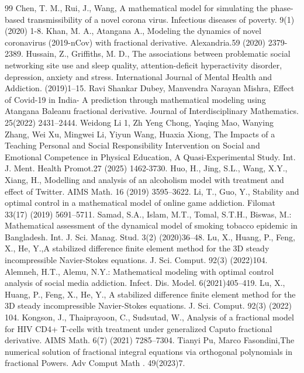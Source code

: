 \documentclass[10pt]{article}
\begin{document}
\begin{thebibliography}{99}
		 Chen, T. M., Rui, J., Wang, A mathematical model for simulating the phase-based transmissibility of a novel corona virus. Infectious diseases of poverty. 9(1)(2020) 1-8.
		 Khan, M. A., Atangana A., Modeling the dynamics of novel coronavirus (2019-nCov) with fractional derivative. Alexandria.59 (2020) 2379-2389.
		 Hussain, Z., Griffiths, M. D., The associations between problematic social networking site use and sleep quality, attention-deficit hyperactivity disorder, depression, anxiety and stress. International Journal of Mental Health and Addiction. (2019)1–15.
		 Ravi Shankar Dubey, Manvendra Narayan Mishra, Effect of Covid-19 in India- A prediction through mathematical modeling using Atangana Baleanu fractional derivative. Journal of Interdisciplinary Mathematics. 25(2022) 2431–2444.
		 Weidong Li 1, Zh Yeng Chong, Yaqing Mao, Wanying Zhang, Wei Xu, Mingwei Li, Yiyun Wang, Huaxia Xiong, The Impacts of a Teaching Personal and Social Responsibility Intervention on Social and Emotional Competence in Physical Education, A Quasi-Experimental Study. Int. J. Ment. Health Promot.27 (2025) 1462-3730.
		 Huo, H., Jing, S.L., Wang, X.Y., Xiang, H., Modelling and analysis of an alcoholism model with treatment and effect of Twitter. AIMS Math. 16 (2019) 3595–3622.
		 Li, T., Guo, Y., Stability and optimal control in a mathematical model of online game addiction. Filomat 33(17) (2019) 5691–5711.
		 Samad, S.A., Islam, M.T., Tomal, S.T.H., Biswas, M.: Mathematical assessment of the dynamical model of smoking tobacco epidemic in Bangladesh. Int. J. Sci. Manag. Stud. 3(2) (2020)36–48.
		 Lu, X., Huang, P., Feng, X., He, Y.,A stabilized difference finite element method for the 3D steady incompressible Navier-Stokes equations. J. Sci. Comput. 92(3) (2022)104.
		 Alemneh, H.T., Alemu, N.Y.: Mathematical modeling with optimal control analysis of social media addiction. Infect. Dis. Model. 6(2021)405–419.
		 Lu, X., Huang, P., Feng, X., He, Y., A stabilized difference finite element method for the 3D steady incompressible Navier-Stokes equations. J. Sci. Comput. 92(3) (2022) 104.
		 Kongson, J., Thaiprayoon, C., Sudsutad, W., Analysis of a fractional model for HIV CD4+ T-cells with treatment under generalized Caputo fractional derivative. AIMS Math. 6(7) (2021) 7285–7304.
		 Tianyi Pu, Marco Fasondini,The numerical solution of fractional integral equations via orthogonal polynomials in fractional Powers. Adv Comput Math . 49(2023)7.

\end{thebibliography}
\end{document}
